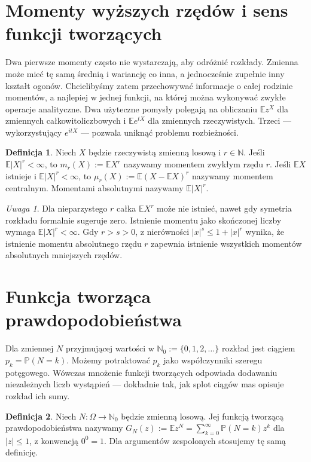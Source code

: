 \documentclass[11pt,a4paper,oneside]{report}
\numberwithin{equation}{chapter}
\theoremstyle{plain}
\theoremstyle{definition}
\newtheorem{definicja}{Definicja}[chapter]
\theoremstyle{remark}
\newtheorem{uwaga}{Uwaga}[chapter]
\newcommand{\N}{\mathbb{N}}
\newcommand{\Prob}{\mathbb{P}}
\newcommand{\E}{\mathbb{E}}
\begin{document}
\section{Momenty wyższych rzędów i sens funkcji tworzących}

Dwa pierwsze momenty często nie wystarczają, aby odróżnić
rozkłady. Zmienna może mieć tę samą średnią i wariancję co inna,
a jednocześnie zupełnie inny kształt ogonów. Chcielibyśmy zatem
przechowywać informacje o całej rodzinie momentów, a najlepiej
w jednej funkcji, na której można wykonywać zwykłe operacje
analityczne. Dwa użyteczne pomysły polegają na obliczaniu
$\E z^X$ dla zmiennych całkowitoliczbowych i $\E e^{tX}$
dla zmiennych rzeczywistych. Trzeci --- wykorzystujący
$e^{itX}$ --- pozwala uniknąć problemu rozbieżności.

\begin{definicja}
Niech $X$ będzie rzeczywistą zmienną losową i $r\in\N$.
Jeśli $\E|X|^r<\infty$, to $m_r(X):=\E X^r$
nazywamy momentem zwykłym rzędu $r$. Jeśli $\E X$
istnieje i $\E|X|^r<\infty$, to
$\mu_r(X):=\E(X-\E X)^r$ nazywamy momentem centralnym.
Momentami absolutnymi nazywamy $\E|X|^r$.
\end{definicja}

\begin{uwaga}
Dla nieparzystego $r$ całka $\E X^r$ może nie istnieć,
nawet gdy symetria rozkładu formalnie sugeruje zero.
Istnienie momentu jako skończonej liczby wymaga
$\E|X|^r<\infty$. Gdy $r>s>0$, z nierówności
$|x|^s\leq 1+|x|^r$ wynika, że istnienie momentu
absolutnego rzędu $r$ zapewnia istnienie wszystkich momentów
absolutnych mniejszych rzędów.
\end{uwaga}

\section{Funkcja tworząca prawdopodobieństwa}

Dla zmiennej $N$ przyjmującej wartości w $\N_0:=\{0,1,2,\ldots\}$
rozkład jest ciągiem $p_k=\Prob(N=k)$. Możemy potraktować
$p_k$ jako współczynniki szeregu potęgowego. Wówczas
mnożenie funkcji tworzących odpowiada dodawaniu niezależnych
liczb wystąpień --- dokładnie tak, jak splot ciągów mas
opisuje rozkład ich sumy.

\begin{definicja}
Niech $N:\Omega\to\N_0$ będzie zmienną losową.
Jej funkcją tworzącą prawdopodobieństwa nazywamy
$G_N(z):=\E z^N=\sum_{k=0}^\infty \Prob(N=k)z^k$
dla $|z|\leq1$, z konwencją $0^0=1$.
Dla argumentów zespolonych stosujemy tę samą definicję.
\end{definicja}
\end{document}
